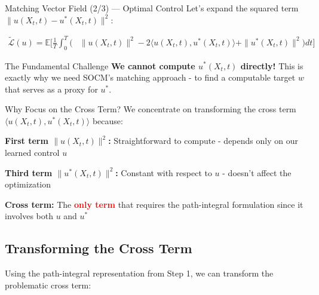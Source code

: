 \documentclass[aspectratio=169,xcolor=dvipsnames]{beamer}
\begin{document}
\begin{frame}[allowframebreaks]{Matching Vector Field (2/3) — Optimal Control}
    Let's expand the squared term $\|u(X_t,t) - u^*(X_t,t)\|^2$:
    
    \begin{equation}
    \begin{aligned}
    \tilde{\mathcal{L}}(u) = \mathbb{E}\Bigg[\frac{1}{T}\int_0^T \Big(
    &\|u(X_t,t)\|^2 - 2\langle u(X_t,t), u^*(X_t,t)\rangle + \|u^*(X_t,t)\|^2\Big) dt \Bigg]
    \end{aligned}
    \end{equation}
        
    \vspace{0.5cm}
    
    \begin{alertblock}{The Fundamental Challenge}
        \textbf{We cannot compute $u^*(X_t,t)$ directly!} This is exactly why we need SOCM's matching approach - to find a computable target $w$ that serves as a proxy for $u^*$.
    \end{alertblock}

        \begin{block}{Why Focus on the Cross Term?}
        We concentrate on transforming the cross term $\langle u(X_t,t), u^*(X_t,t)\rangle$ because:
        
        \vspace{0.3cm}
        
        \textbf{First term $\|u(X_t,t)\|^2$:} Straightforward to compute - depends only on our learned control $u$
        
        \vspace{0.3cm}
        
        \textbf{Third term $\|u^*(X_t,t)\|^2$:} Constant with respect to $u$ - doesn't affect the optimization
        
        \vspace{0.3cm}
        
        \textbf{Cross term:} The \textcolor{red}{\textbf{only term}} that requires the path-integral formulation since it involves both $u$ and $u^*$
    \end{block}

    \vspace{0.5cm}
    
    \subsection*{Transforming the Cross Term}
    
    Using the path-integral representation from Step 1, we can transform the problematic cross term:
    

\end{frame}
\end{document}
